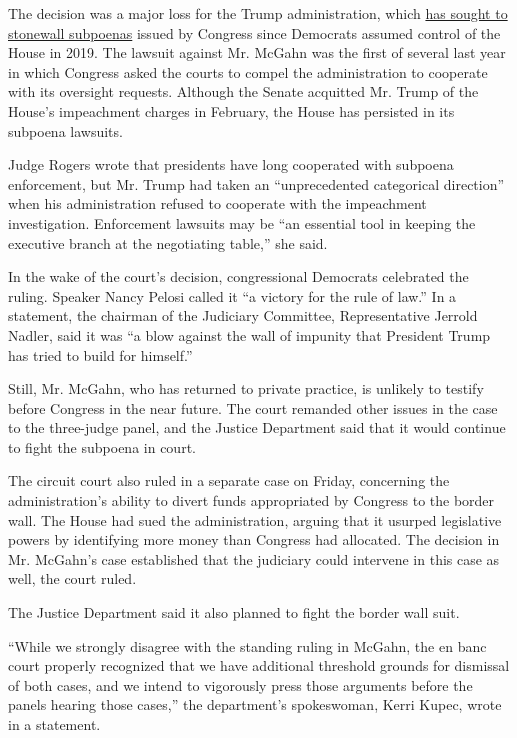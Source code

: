 The decision was a major loss for the Trump administration, which
\href{https://www.nytimes.com/2019/04/24/us/politics/donald-trump-subpoenas.html}{has
sought to stonewall subpoenas} issued by Congress since Democrats
assumed control of the House in 2019. The lawsuit against Mr. McGahn was
the first of several last year in which Congress asked the courts to
compel the administration to cooperate with its oversight requests.
Although the Senate acquitted Mr. Trump of the House's impeachment
charges in February, the House has persisted in its subpoena lawsuits.

Judge Rogers wrote that presidents have long cooperated with subpoena
enforcement, but Mr. Trump had taken an ``unprecedented categorical
direction'' when his administration refused to cooperate with the
impeachment investigation. Enforcement lawsuits may be ``an essential
tool in keeping the executive branch at the negotiating table,'' she
said.

In the wake of the court's decision, congressional Democrats celebrated
the ruling. Speaker Nancy Pelosi called it ``a victory for the rule of
law.'' In a statement, the chairman of the Judiciary Committee,
Representative Jerrold Nadler, said it was ``a blow against the wall of
impunity that President Trump has tried to build for himself.''

Still, Mr. McGahn, who has returned to private practice, is unlikely to
testify before Congress in the near future. The court remanded other
issues in the case to the three-judge panel, and the Justice Department
said that it would continue to fight the subpoena in court.

The circuit court also ruled in a separate case on Friday, concerning
the administration's ability to divert funds appropriated by Congress to
the border wall. The House had sued the administration, arguing that it
usurped legislative powers by identifying more money than Congress had
allocated. The decision in Mr. McGahn's case established that the
judiciary could intervene in this case as well, the court ruled.

The Justice Department said it also planned to fight the border wall
suit.

``While we strongly disagree with the standing ruling in McGahn, the en
banc court properly recognized that we have additional threshold grounds
for dismissal of both cases, and we intend to vigorously press those
arguments before the panels hearing those cases,'' the department's
spokeswoman, Kerri Kupec, wrote in a statement.


